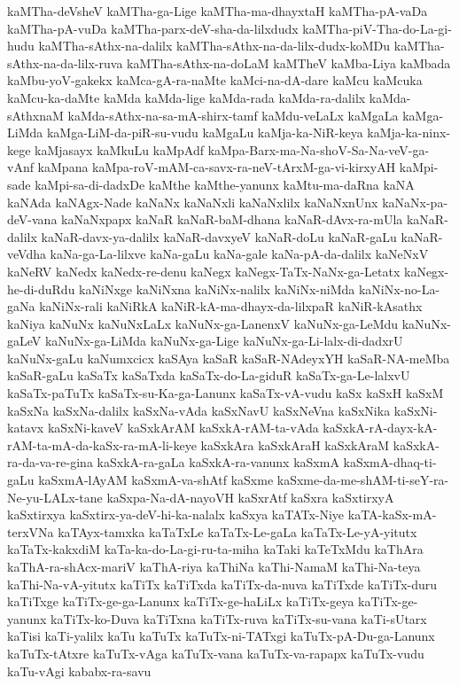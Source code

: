{kaMTha-deVsheV
kaMTha-ga-Lige
kaMTha-ma-dhayxtaH
kaMTha-pA-vaDa
kaMTha-pA-vuDa
kaMTha-parx-deV-sha-da-lilxdudx
kaMTha-piV-Tha-do-La-gi-hudu
kaMTha-sAthx-na-dalilx
kaMTha-sAthx-na-da-lilx-dudx-koMDu
kaMTha-sAthx-na-da-lilx-ruva
kaMTha-sAthx-na-doLaM
kaMTheV
kaMba-Liya
kaMbada
kaMbu-yoV-gakekx
kaMca-gA-ra-naMte
kaMci-na-dA-dare
kaMcu
kaMcuka
kaMcu-ka-daMte
kaMda
kaMda-lige
kaMda-rada
kaMda-ra-dalilx
kaMda-sAthxnaM
kaMda-sAthx-na-sa-mA-shirx-tamf
kaMdu-veLaLx
kaMgaLa
kaMga-LiMda
kaMga-LiM-da-piR-su-vudu
kaMgaLu
kaMja-ka-NiR-keya
kaMja-ka-ninx-kege
kaMjasayx
kaMkuLu
kaMpAdf
kaMpa-Barx-ma-Na-shoV-Sa-Na-veV-ga-vAnf
kaMpana
kaMpa-roV-mAM-ca-savx-ra-neV-tArxM-ga-vi-kirxyAH
kaMpi-sade
kaMpi-sa-di-dadxDe
kaMthe
kaMthe-yanunx
kaMtu-ma-daRna
kaNA
kaNAda
kaNAgx-Nade
kaNaNx
kaNaNxli
kaNaNxlilx
kaNaNxnUnx
kaNaNx-pa-deV-vana
kaNaNxpapx
kaNaR
kaNaR-baM-dhana
kaNaR-dAvx-ra-mUla
kaNaR-dalilx
kaNaR-davx-ya-dalilx
kaNaR-davxyeV
kaNaR-doLu
kaNaR-gaLu
kaNaR-veVdha
kaNa-ga-La-lilxve
kaNa-gaLu
kaNa-gale
kaNa-pA-da-dalilx
kaNeNxV
kaNeRV
kaNedx
kaNedx-re-denu
kaNegx
kaNegx-TaTx-NaNx-ga-Letatx
kaNegx-he-di-duRdu
kaNiNxge
kaNiNxna
kaNiNx-nalilx
kaNiNx-niMda
kaNiNx-no-La-gaNa
kaNiNx-rali
kaNiRkA
kaNiR-kA-ma-dhayx-da-lilxpaR
kaNiR-kAsathx
kaNiya
kaNuNx
kaNuNxLaLx
kaNuNx-ga-LanenxV
kaNuNx-ga-LeMdu
kaNuNx-gaLeV
kaNuNx-ga-LiMda
kaNuNx-ga-Lige
kaNuNx-ga-Li-lalx-di-dadxrU
kaNuNx-gaLu
kaNumxcicx
kaSAya
kaSaR
kaSaR-NAdeyxYH
kaSaR-NA-meMba
kaSaR-gaLu
kaSaTx
kaSaTxda
kaSaTx-do-La-giduR
kaSaTx-ga-Le-lalxvU
kaSaTx-paTuTx
kaSaTx-su-Ka-ga-Lanunx
kaSaTx-vA-vudu
kaSx
kaSxH
kaSxM
kaSxNa
kaSxNa-dalilx
kaSxNa-vAda
kaSxNavU
kaSxNeVna
kaSxNika
kaSxNi-katavx
kaSxNi-kaveV
kaSxkArAM
kaSxkA-rAM-ta-vAda
kaSxkA-rA-dayx-kA-rAM-ta-mA-da-kaSx-ra-mA-li-keye
kaSxkAra
kaSxkAraH
kaSxkAraM
kaSxkA-ra-da-va-re-gina
kaSxkA-ra-gaLa
kaSxkA-ra-vanunx
kaSxmA
kaSxmA-dhaq-ti-gaLu
kaSxmA-lAyAM
kaSxmA-va-shAtf
kaSxme
kaSxme-da-me-shAM-ti-seY-ra-Ne-yu-LALx-tane
kaSxpa-Na-dA-nayoVH
kaSxrAtf
kaSxra
kaSxtirxyA
kaSxtirxya
kaSxtirx-ya-deV-hi-ka-nalalx
kaSxya
kaTATx-Niye
kaTA-kaSx-mA-terxVNa
kaTAyx-tamxka
kaTaTxLe
kaTaTx-Le-gaLa
kaTaTx-Le-yA-yitutx
kaTaTx-kakxdiM
kaTa-ka-do-La-gi-ru-ta-miha
kaTaki
kaTeTxMdu
kaThAra
kaThA-ra-shAcx-mariV
kaThA-riya
kaThiNa
kaThi-NamaM
kaThi-Na-teya
kaThi-Na-vA-yitutx
kaTiTx
kaTiTxda
kaTiTx-da-nuva
kaTiTxde
kaTiTx-duru
kaTiTxge
kaTiTx-ge-ga-Lanunx
kaTiTx-ge-haLiLx
kaTiTx-geya
kaTiTx-ge-yanunx
kaTiTx-ko-Duva
kaTiTxna
kaTiTx-ruva
kaTiTx-su-vana
kaTi-sUtarx
kaTisi
kaTi-yalilx
kaTu
kaTuTx
kaTuTx-ni-TATxgi
kaTuTx-pA-Du-ga-Lanunx
kaTuTx-tAtxre
kaTuTx-vAga
kaTuTx-vana
kaTuTx-va-rapapx
kaTuTx-vudu
kaTu-vAgi
kababx-ra-savu
}
